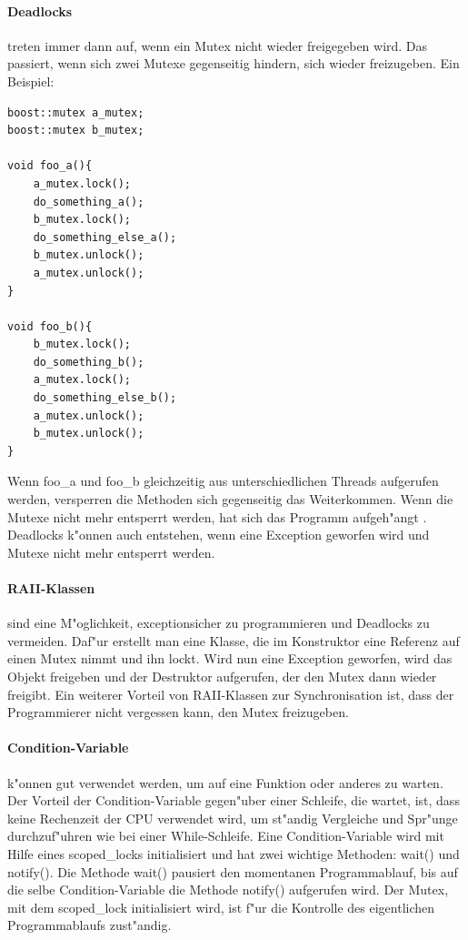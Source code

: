 \documentclass[14pt, a4paper]{report}
\begin{document}
\paragraph{Deadlocks} treten immer dann auf, wenn ein Mutex nicht wieder freigegeben 
wird. Das passiert, wenn sich zwei Mutexe gegenseitig hindern, sich wieder 
freizugeben. Ein Beispiel:
\begin{lstlisting}
boost::mutex a_mutex;
boost::mutex b_mutex;

void foo_a(){
	a_mutex.lock();
	do_something_a();
	b_mutex.lock();
	do_something_else_a();
	b_mutex.unlock();
	a_mutex.unlock();
}

void foo_b(){
	b_mutex.lock();
	do_something_b();
	a_mutex.lock();
	do_something_else_b();
	a_mutex.unlock();
	b_mutex.unlock();
}
\end{lstlisting}
Wenn foo\_a und foo\_b gleichzeitig aus unterschiedlichen Threads aufgerufen werden, 
versperren die Methoden sich gegenseitig das Weiterkommen. Wenn die Mutexe nicht mehr
entsperrt werden, hat sich das Programm
\glqq aufgeh"angt \grqq. Deadlocks k"onnen auch entstehen, wenn eine Exception geworfen wird und
Mutexe nicht mehr entsperrt werden.

\paragraph{RAII-Klassen} sind eine M"oglichkeit, exceptionsicher zu programmieren und 
Deadlocks zu vermeiden. Daf"ur erstellt man eine Klasse, die im Konstruktor eine 
Referenz auf einen Mutex nimmt und ihn lockt. Wird nun eine Exception geworfen, wird
das Objekt freigeben und der Destruktor aufgerufen, der den Mutex dann wieder freigibt.
Ein weiterer Vorteil von RAII-Klassen zur Synchronisation ist, dass der Programmierer 
nicht vergessen kann, den Mutex freizugeben.

\paragraph{Condition-Variable} k"onnen gut verwendet werden, um auf eine Funktion
oder anderes zu warten. Der Vorteil der Condition-Variable gegen"uber einer Schleife,
die wartet, ist, dass keine Rechenzeit der CPU verwendet wird, um st"andig Vergleiche und
Spr"unge durchzuf"uhren wie bei einer While-Schleife. 
Eine Condition-Variable wird mit Hilfe eines scoped\_locks
initialisiert und hat zwei wichtige Methoden: wait() und notify(). Die Methode wait() 
pausiert den momentanen Programmablauf, bis auf die selbe Condition-Variable die Methode
notify() aufgerufen wird. Der Mutex, mit dem scoped\_lock initialisiert wird, ist f"ur die
Kontrolle des eigentlichen Programmablaufs zust"andig.
\end{document}
